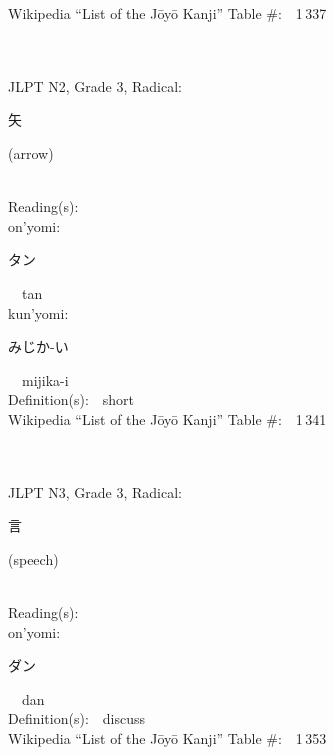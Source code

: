 \begin{multicols}{2}
Wikipedia ``List of the J\=oy\=o Kanji'' Table \#:\ \ 1\,337 \\
\ \ \\
{\fontsize{34pt}{40pt}  }\ \ \\  %
{JLPT N2, Grade 3, Radical:\ \ {\begin{CJK}{UTF8}{min} 矢 \end{CJK}} (arrow) } \\
Reading(s):\ \ \\
{\hspace*{1em}}on'yomi:\ \ \\
{\hspace*{2em}}{\begin{CJK}{UTF8}{min} タン \end{CJK}}\ \ tan\ \ \\
{\hspace*{1em}}kun'yomi:\ \ \\
{\hspace*{2em}}{\begin{CJK}{UTF8}{min} みじか-い \end{CJK}}\ \ mijika-i\ \ \\
Definition(s):\ \ short \\
Wikipedia ``List of the J\=oy\=o Kanji'' Table \#:\ \ 1\,341 \\
\ \ \\
{\fontsize{34pt}{40pt}  }\ \ \\  %
{JLPT N3, Grade 3, Radical:\ \ {\begin{CJK}{UTF8}{min} 言 \end{CJK}} (speech) } \\
Reading(s):\ \ \\
{\hspace*{1em}}on'yomi:\ \ \\
{\hspace*{2em}}{\begin{CJK}{UTF8}{min} ダン \end{CJK}}\ \ dan\ \ \\
Definition(s):\ \ discuss \\
Wikipedia ``List of the J\=oy\=o Kanji'' Table \#:\ \ 1\,353 \\

\end{multicols}
